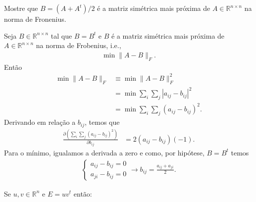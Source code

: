 \begin{questions}
    \question Mostre que $B = \left( A + A^t \right) / 2$ \'{e} a matriz sim\'{e}trica mais pr\'{o}xima de $A \in \mathbb{R}^{n \times n}$ na norma de Fronenius.
    \begin{solution}
        Seja $B \in \mathbb{R}^{n \times n}$ tal que $B = B^t$ e $B$ \'{e} a matriz sim\'{e}trica mais pr\'{o}xima de $A \in \mathbb{R}^{n \times n}$ na norma de Frobenius, i.e.,
        \begin{align*}
            \min \| A - B \|_F.
        \end{align*}
        Ent\~{a}o
        \begin{align*}
            \min \| A - B \|_F &\equiv \min \| A - B \|_F^2 \\
            &= \min \sum_i \sum_j | a_{ij} - b_{ij} |^2 \\
            &= \min \sum_i \sum_j \left( a_{ij} - b_{ij} \right)^2.
        \end{align*}
        Derivando em rela\c{c}\~{a}o a $b_{ij}$, temos que
        \begin{align*}
            \frac{\partial \left( \sum_i \sum_j \left( a_{ij} - b_{ij} \right)^2 \right)}{\partial b_{ij}} &= 2 \left( a_{ij} - b_{ij} \right) \left( -1 \right).
        \end{align*}
        Para o m\'{i}nimo, igualamos a derivada a zero e como, por hip\'{o}tese, $B = B^t$ temos
        \begin{align*}
            \begin{cases}
                a_{ij} - b_{ij} = 0 \\
                a_{ji} - b_{ij} = 0
            \end{cases} \rightarrow b_{ij} = \frac{a_{ij} + a_{ji}}{2}.
        \end{align*}
    \end{solution}

    \question Se $u, v \in \mathbb{R}^n$ e $E = u v^t$ ent\~{a}o:
\end{questions}
